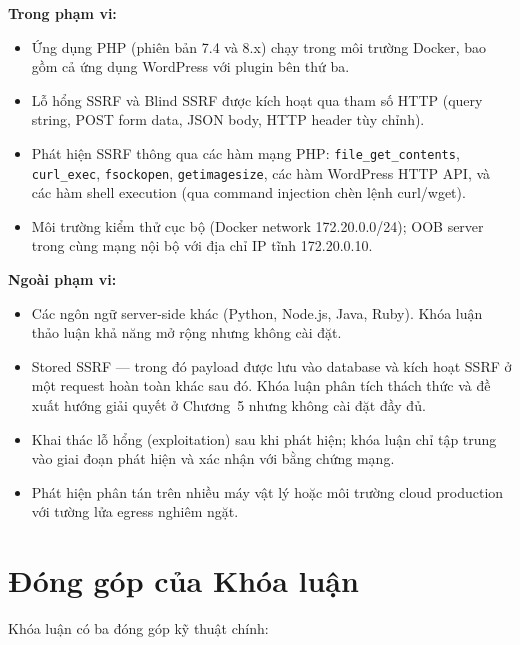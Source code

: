 \textbf{Trong phạm vi:}
\begin{itemize}
    \item Ứng dụng PHP (phiên bản 7.4 và 8.x) chạy trong môi trường Docker, bao gồm
    cả ứng dụng WordPress với plugin bên thứ ba.
    \item Lỗ hổng SSRF và Blind SSRF được kích hoạt qua tham số HTTP (query string,
    POST form data, JSON body, HTTP header tùy chỉnh).
    \item Phát hiện SSRF thông qua các hàm mạng PHP: \texttt{file\_get\_contents},
    \texttt{curl\_exec}, \texttt{fsockopen}, \texttt{getimagesize}, các hàm WordPress
    HTTP API, và các hàm shell execution (qua command injection chèn lệnh curl/wget).
    \item Môi trường kiểm thử cục bộ (Docker network 172.20.0.0/24); OOB server
    trong cùng mạng nội bộ với địa chỉ IP tĩnh 172.20.0.10.
\end{itemize}

\textbf{Ngoài phạm vi:}
\begin{itemize}
    \item Các ngôn ngữ server-side khác (Python, Node.js, Java, Ruby). Khóa luận
    thảo luận khả năng mở rộng nhưng không cài đặt.
    \item Stored SSRF --- trong đó payload được lưu vào database và kích hoạt SSRF ở
    một request hoàn toàn khác sau đó. Khóa luận phân tích thách thức và đề xuất
    hướng giải quyết ở Chương~5 nhưng không cài đặt đầy đủ.
    \item Khai thác lỗ hổng (exploitation) sau khi phát hiện; khóa luận chỉ tập
    trung vào giai đoạn phát hiện và xác nhận với bằng chứng mạng.
    \item Phát hiện phân tán trên nhiều máy vật lý hoặc môi trường cloud production
    với tường lửa egress nghiêm ngặt.
\end{itemize}

\section{Đóng góp của Khóa luận}
\label{sec:contributions}

Khóa luận có ba đóng góp kỹ thuật chính:

